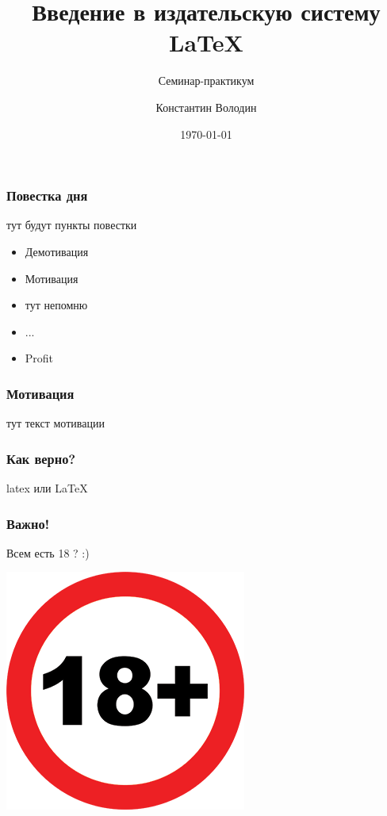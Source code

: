 \documentclass[fullscreen=true]{beamer}
\begin{document}
\title{Введение в издательскую систему \LaTeX}
\subtitle{Семинар-практикум}  
\author{Константин Володин}
\date{\today} 


%

\begin{frame}
	\frametitle{Повестка дня}
	тут будут пункты повестки
	\begin{itemize}
		\item Демотивация
		\item Мотивация
		\item тут непомню
		\item ...
		\item Profit
	\end{itemize}
\end{frame}

%

\begin{frame}
	\frametitle{Мотивация}
	тут текст мотивации
\end{frame}

\begin{frame}
	\frametitle{Как верно?}
	\centerline{\Large{latex или \LaTeX}}
\end{frame}

\begin{frame}
	\frametitle{Важно!}
	\pause
	\centerline{Всем есть 18 ? :)}
	\vfill
	\pause
	\centerline{\includegraphics[scale=0.4]{images/18.png}}
\end{frame}
\end{document}
